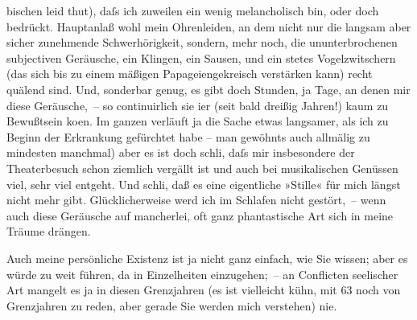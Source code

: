                bischen leid thut), daſs ich {\pb}zuweilen ein wenig
               melancholisch bin, oder doch bedrückt. Hauptanlaß wohl mein Ohrenleiden, an dem nicht
               nur die langsam aber sicher zunehmende Schwerhörigkeit, sondern, mehr noch, die
               ununterbrochenen subjectiven Geräusche, ein Klingen, ein Sausen, und ein \strikeout{\textcolor{gray}{nicht}} stetes Vogelzwitschern (das sich bis zu einem mäßigen Papageiengekreisch
               verstärken kann) recht quälend sind. Und, sonderbar genug, es gibt doch Stunden, ja
               Tage, an denen mir diese Geräusche, – so continuirlich sie i{\geminationm}er (seit bald dreißig Jahren!) kaum zu Bewußtsein ko{\geminationm}en. Im ganzen verläuft ja die Sache etwas langsamer,
               als ich zu Beginn der Erkrankung gefürchtet habe – man gewöhnts auch allmälig \label{T_L02444-1v}\label{T_L02444-1}zu mindesten manchmal) aber es ist doch schli{\geminationm}, daſs mir insbesondere der Theaterbesuch schon
               ziemlich vergällt ist und auch bei musikalischen Genüssen viel, sehr viel entgeht.
               Und schli{\geminationm}, {\pb}daß es
               eine eigentliche »Stille« für mich längst nicht mehr gibt. Glücklicherweise werd ich
               im Schlafen nicht gestört, – wenn auch diese Geräusche auf mancherlei, oft ganz
               phantastische Art sich in meine Träume drängen.\pend
           
\pstart
           Auch meine persönliche Existenz ist ja nicht ganz einfach, wie Sie wissen; aber es
               würde zu weit führen, da in Einzelheiten einzugehen; – an Conflicten seelischer Art
               mangelt es ja in diesen Grenzjahren (es ist vielleicht kühn, mit 63 noch von
               Grenzjahren zu reden, aber gerade Sie werden mich verstehen) nie.\pend
           
